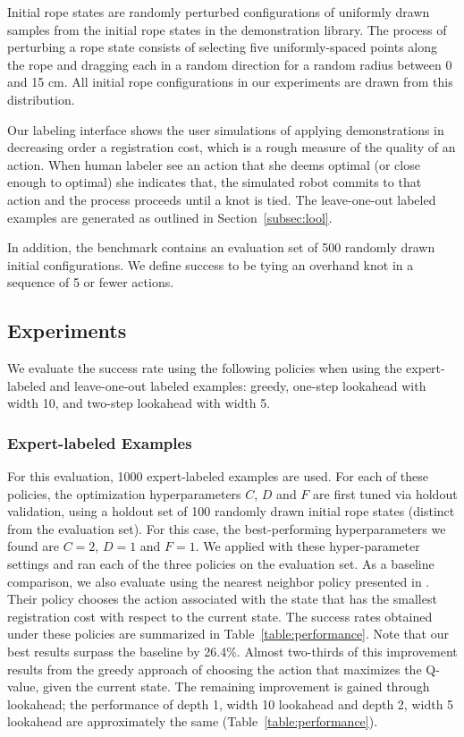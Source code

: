 Initial rope states are randomly perturbed configurations of uniformly drawn samples from the initial rope states in the demonstration library.
The process of perturbing a rope state consists of selecting five uniformly-spaced points along the rope and dragging each in a random direction for a random radius between 0 and 15 cm.
All initial rope configurations in our experiments are drawn from this distribution.

Our labeling interface shows the user simulations of applying demonstrations in decreasing order a registration cost, which is a rough measure of the quality of an action.
When human labeler see an action that she deems optimal (or close enough to optimal) she indicates that, the simulated robot commits to that action and the process 
proceeds until a knot is tied.
The leave-one-out labeled examples are generated as outlined in Section~\ref{subsec:lool}. 

In addition, the benchmark contains an evaluation set of 500 randomly drawn initial configurations. 
We define success to be tying an overhand knot in a sequence of 5 or fewer actions.

\subsection{Experiments}
We evaluate the success rate using the following policies when using the expert-labeled and leave-one-out labeled examples: greedy, one-step lookahead with width 10, and two-step lookahead with width 5.
\subsubsection{Expert-labeled Examples}
For this evaluation, 1000 expert-labeled examples are used.
For each of these policies, the optimization hyperparameters $C$, $D$ and $F$ are first tuned via holdout 
validation, using a holdout set of 100 randomly drawn initial rope states (distinct from the evaluation set). 
For this case, the best-performing hyperparameters we found are $C=2$, $D=1$ and $F=1$.
We applied \mmql{} with these hyper-parameter settings and ran each of the three policies 
on the evaluation set.
As a baseline comparison, we also evaluate using the nearest neighbor policy presented in \citet{Schulmanetal_ISRR2013}.
Their policy chooses the action associated with the state that has the smallest registration cost with respect to the current state.
The success rates obtained under these policies are summarized in Table~\ref{table:performance}. Note that our best results surpass the baseline by 26.4\%.
Almost two-thirds of this improvement results from the greedy approach of choosing the action that
maximizes the Q-value, given the current state. The remaining improvement is gained through lookahead; the
performance of depth 1, width 10 lookahead and depth 2, width 5 lookahead are approximately the same (Table~\ref{table:performance}).

